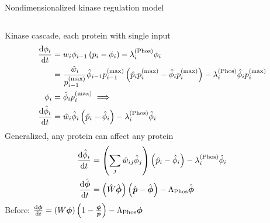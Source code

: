\begin{frame}{Nondimensionalized kinase regulation model}
\begin{columns}
\begin{column}{0.7\textwidth}
Kinase cascade, each protein with single input
\begin{subequations}
\begin{align}
\dv{\phi_i}{t} &=
    w_i \phi_{i-1} \left(p_i - \phi_i\right) - \lambda_i^{(\text{Phos})} \phi_i    
\\
    &=
    \frac{\hat{w}_i}{p_{i-1}^{(\text{max})}} \hat{\phi}_{i-1} p_{i-1}^{(\text{max})} \left(\hat{p}_i p_i^{(\text{max})} - \hat{\phi}_i p_i^{(\text{max})} \right) - \lambda_i^{(\text{Phos})} \hat{\phi}_i p_i^{(\text{max})}
\\
\phi_i &= \hat{\phi}_i p_i^{(\text{max})} \implies
\\
\dv{\hat{\phi}_i}{t} &=
    \hat{w}_i \hat{\phi}_i \left(\hat{p}_i - \hat{\phi}_i\right) - \lambda_i^{(\text{Phos})} \hat{\phi}_i
\end{align}
\end{subequations}
Generalized, any protein can affect any protein
\begin{subequations}
\begin{align}
\dv{\hat{\phi}_i}{t} &=
    \left( \sum_j \hat{w}_{ij} \hat{\phi}_j \right) \left(\hat{p}_i - \hat{\phi}_i\right) - \lambda_i^{(\text{Phos})} \hat{\phi}_i
\\
\dv{\hat{\boldsymbol{\phi}}}{t} &= 
    \left(\hat{W} \hat{\boldsymbol{\phi}}\right) \left(\hat{\boldsymbol{p}} - \hat{\boldsymbol{\phi}}\right) - \Lambda_\text{Phos} \hat{\boldsymbol{\phi}}
\end{align}
\end{subequations}
Before: $\dv{\boldsymbol{\phi}}{t} = (W \boldsymbol{\phi}) \left(1 - \frac{\boldsymbol{\phi}}{\boldsymbol{p}}\right) - \Lambda_\text{Phos} \boldsymbol{\phi}$
\end{column}


\end{columns}
\end{frame}
